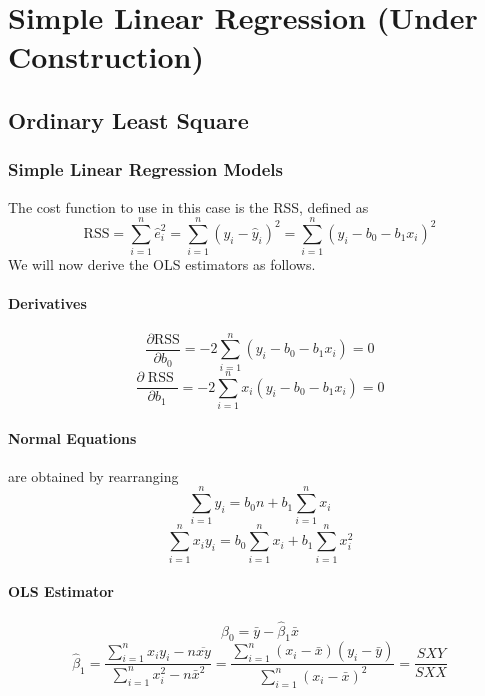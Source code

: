 \documentclass[11pt]{article}
\begin{document}
\section{Simple Linear Regression (Under Construction)}
\subsection{Ordinary Least Square}
\subsubsection{Simple Linear Regression Models}
The cost function to use in this case is the RSS, defined as
\begin{equation*}
    \mathrm{RSS}=\sum_{i=1}^{n} \hat{e}_{i}^{2}=\sum_{i=1}^{n}\left(y_{i}-\hat{y}_{i}\right)^{2}=\sum_{i=1}^{n}\left(y_{i}-b_{0}-b_{1} x_{i}\right)^{2}
\end{equation*}
We will now derive the OLS estimators as follows. 
\paragraph{Derivatives}
\begin{equation*}
    \frac{\partial \mathrm{RSS}}{\partial b_{0}}=-2 \sum_{i=1}^{n}\left(y_{i}-b_{0}-b_{1} x_{i}\right)=0
\end{equation*}
\begin{equation*}
    \frac{\partial \operatorname{RSS}}{\partial b_{1}}=-2 \sum_{i=1}^{n} x_{i}\left(y_{i}-b_{0}-b_{1} x_{i}\right)=0
\end{equation*}
\paragraph{Normal Equations} are obtained by rearranging
\begin{equation}
    \sum_{i=1}^{n} y_{i}=b_{0} n+b_{1} \sum_{i=1}^{n} x_{i}
\end{equation}
\begin{equation}
    \sum_{i=1}^{n} x_{i} y_{i}=b_{0} \sum_{i=1}^{n} x_{i}+b_{1} \sum_{i=1}^{n} x_{i}^{2}
\end{equation}
\paragraph{OLS Estimator}
\begin{equation*}
    \hat{\beta}_{0}=\bar{y}-\hat{\beta}_{1} \bar{x}
\end{equation*}
\begin{equation*}
    \hat{\beta}_{1}=\frac{\sum_{i=1}^{n} x_{i} y_{i}-n \overline{x y}}{\sum_{i=1}^{n} x_{i}^{2}-n \bar{x}^{2}}=\frac{\sum_{i=1}^{n}\left(x_{i}-\bar{x}\right)\left(y_{i}-\bar{y}\right)}{\sum_{i=1}^{n}\left(x_{i}-\bar{x}\right)^{2}}=\frac{S X Y}{S X X}
\end{equation*}
\end{document}
